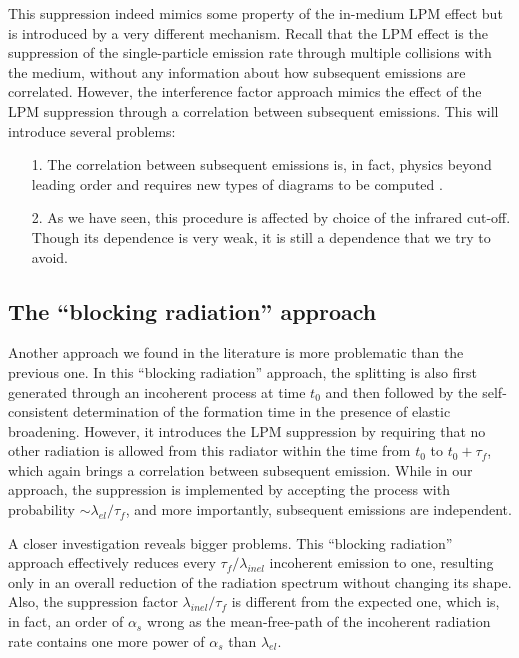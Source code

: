 This suppression indeed mimics some property of the in-medium LPM effect but is introduced by a very different mechanism.
Recall that the LPM effect is the suppression of the single-particle emission rate through multiple collisions with the medium, without any information about how subsequent emissions are correlated.
However, the interference factor approach mimics the effect of the LPM suppression through a correlation between subsequent emissions.
This will introduce several problems: 
\begin{itemize}
\item[1.] The correlation between subsequent emissions is, in fact, physics beyond leading order and requires new types of diagrams to be computed \cite{Arnold:2015qya,Arnold:2016kek,Arnold:2016mth,Arnold:2016jnq}.
\item[2.] As we have seen, this procedure is affected by choice of the infrared cut-off. Though its dependence is very weak, it is still a dependence that we try to avoid.
\end{itemize}

\subsection{The ``blocking radiation'' approach}
Another approach we found in the literature \cite{ColemanSmith:2012vr}
is more problematic than the previous one.
In this ``blocking radiation'' approach, the splitting is also first generated through an incoherent process at time $t_0$ and then followed by the self-consistent determination of the formation time in the presence of elastic broadening. 
However, it introduces the LPM suppression by requiring that no other radiation is allowed from this radiator within the time from $t_0$ to $t_0 + \tau_f$, which again brings a correlation between subsequent emission.
While in our approach, the suppression is implemented by accepting the process with probability $\sim \lambda_{el}/\tau_f$, and more importantly, subsequent emissions are independent.

A closer investigation reveals bigger problems.
This ``blocking radiation'' approach effectively reduces every $\tau_f/\lambda_{inel}$ incoherent emission to one, resulting only in an overall reduction of the radiation spectrum without changing its shape.
Also, the suppression factor $\lambda_{inel}/\tau_f$ is different from the expected one, which is, in fact, an order of $\alpha_s$ wrong as the mean-free-path of the incoherent radiation rate contains one more power of $\alpha_s$ than $\lambda_{el}$.

